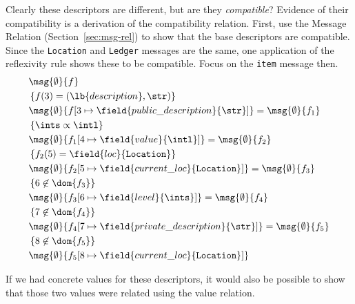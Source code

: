Clearly these descriptors are different, but are they \emph{compatible}?
Evidence of their compatibility is a derivation of the compatibility relation.
First, use the Message Relation (Section~\ref{sec:msg-rel}) to show that the base
descriptors are compatible. Since the \texttt{Location} and \texttt{Ledger}
messages are the same, one application of the reflexivity rule shows these to be
compatible. Focus on the \texttt{item} message then. 
\begin{align*}
  &\msg{\emptyset}{f} \\
  &\left\{f(3) = (\lb{description}, \str) \right\} \\
  &\msg{\emptyset}{f[3 \mapsto \field{public\_description}{\str}]} = \msg{\emptyset}{f_1} \\
  &\left\{ \ints \propto \intl \right\} \\
  &\msg{\emptyset}{f_1[4 \mapsto \field{value}{\intl}]} = \msg{\emptyset}{f_2} \\
  &\left\{ f_2(5) = \field{loc}{\mathtt{Location}} \right\} \\
  &\msg{\emptyset}{f_2[5 \mapsto \field{current\_loc}{\mathtt{Location}}]} = \msg{\emptyset}{f_3} \\
  &\left\{ 6 \not \in \dom{f_3} \right\} \\
  &\msg{\emptyset}{f_3[6 \mapsto \field{level}{\ints}]} = \msg{\emptyset}{f_4} \\
  &\left\{ 7 \not \in \dom{f_4} \right\} \\
  &\msg{\emptyset}{f_4[7 \mapsto \field{private\_description}{\str}]} = \msg{\emptyset}{f_5} \\
  &\left\{ 8 \not \in \dom{f_5} \right\} \\
  &\msg{\emptyset}{f_5[8 \mapsto \field{current\_loc}{\mathtt{Location}}]}
\end{align*}

If we had concrete values for these descriptors, it would also be possible to
show that those two values were related using the value relation.

